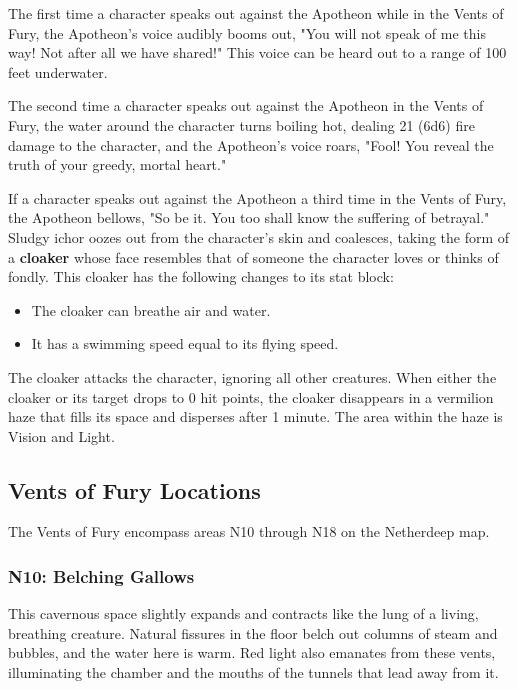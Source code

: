 \documentclass[10pt,a4paper,twoside,fancy,bg=print,twocolumn,openany,nodeprecatedcode]{dndbook}
\begin{document}
The first time a character speaks out against the Apotheon while in the Vents of Fury, the Apotheon's voice audibly booms out, "You will not speak of me this way! Not after all we have shared!" This voice can be heard out to a range of 100 feet underwater.

The second time a character speaks out against the Apotheon in the Vents of Fury, the water around the character turns boiling hot, dealing 21 (6d6) fire damage to the character, and the Apotheon's voice roars, "Fool! You reveal the truth of your greedy, mortal heart."

If a character speaks out against the Apotheon a third time in the Vents of Fury, the Apotheon bellows, "So be it. You too shall know the suffering of betrayal." Sludgy ichor oozes out from the character's skin and coalesces, taking the form of a \textbf{cloaker} whose face resembles that of someone the character loves or thinks of fondly. This cloaker has the following changes to its stat block:


\begin{itemize}
\item The cloaker can breathe air and water.
\item It has a swimming speed equal to its flying speed.
\end{itemize}

The cloaker attacks the character, ignoring all other creatures. When either the cloaker or its target drops to 0 hit points, the cloaker disappears in a vermilion haze that fills its space and disperses after 1 minute. The area within the haze is Vision and Light.

\subsection{Vents of Fury Locations}
The Vents of Fury encompass areas N10 through N18 on the Netherdeep map.

\subsubsection{N10: Belching Gallows}
\begin{DndReadAloud}{}
This cavernous space slightly expands and contracts like the lung of a living, breathing creature. Natural fissures in the floor belch out columns of steam and bubbles, and the water here is warm. Red light also emanates from these vents, illuminating the chamber and the mouths of the tunnels that lead away from it.

\end{DndReadAloud}
\end{document}
